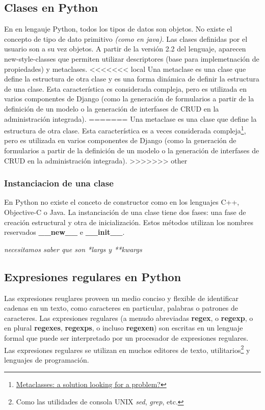 \documentclass[a4paper]{report}
\begin{document}
\subsection{Clases en Python}
En en lengauje Python, todos los tipos de datos son objetos. No existe el
concepto
de tipo de dato primitivo \emph{(como en java)}. Las clases definidas por el
usuario
son a su vez objetos.
A partir de la versión 2.2 del lenguaje, aparecen new-style-classes que
permiten 
utilizar descriptores (base para implemetnación de propiedades) y metaclases.
<<<<<<< local
Una metaclase es una clase que define la estructura de otra clase y es una forma
dinámica de 
definir la estructura de una clase. Esta característica es considerada compleja,
pero es 
utilizada en varios componentes de Django (como la generación de formularios a
partir de la definición
de un modelo o la generación de interfases de CRUD en la administración
integrada).
=======
Una metaclase es una clase que define la estructura de otra clase.
Esta característica es a veces considerada
compleja\footnote{\href{http://www.ibm.com/developerworks/linux/library/l-pymeta.html\#h3}
{Metaclasses: a solution looking for a problem?}},
pero es utilizada en varios componentes de Django 
(como la generación de formularios a partir de la definición de un modelo o
 la generación de interfases de CRUD en la administración integrada).
>>>>>>> other

\subsubsection*{Instanciacion de una clase}
En Python no existe el conceto de constructor como en los lenguajes C++,
Objective-C o 
Java. La instanciación de una clase tiene dos fases: una fase de creación
estructural y
otra de inicialización. Estos métodos utilizan los nombres reservados
\textbf{\_\_new\_\_} e
\textbf{\_\_init\_\_}.

\emph{necesitamos saber que son *largs y **kwargs}




\subsection{Expresiones regulares en Python}
Las expresiones reuglares proveen un medio conciso y flexible de identificar
cadenas en un texto, como
caracteres en particular, palabras o patrones de caracteres. Las expresiones
regulares (a menudo
abreviadas \textbf{regex}, o \textbf{regexp}, o en plural \textbf{regexes},
\textbf{regexps}, o incluso \textbf{regexen})
son escritas en un lenguaje formal que puede ser interpretado por un procesador
de expresiones regulares.
Las expresiones regulares se utilizan en muchos editores de texto,
utilitarios\footnote{
Como las utilidades de consola UNIX \emph{sed}, \emph{grep}, etc.} y lenguajes
de programación.
\end{document}
